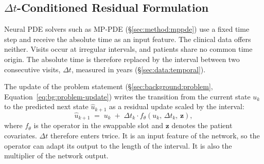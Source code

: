 \subsection{\texorpdfstring{$\Delta t$}{Delta t}-Conditioned Residual Formulation}
\label{sec:method:dt-residual}

Neural PDE solvers such as MP-PDE (\S\ref{sec:method:mppde}) use a fixed
time step and receive the absolute time as an input feature. The clinical data offers neither. Visits
occur at irregular intervals, and patients share no common time origin. The
absolute time is therefore replaced by the interval between two
consecutive visits, $\Delta t$, measured in years (\S\ref{sec:data:temporal}).

The update of the problem statement (\S\ref{sec:background:problem},
Equation~\eqref{eq:bg:problem-update}) writes the transition from the
current state $u_k$ to the predicted next state $\hat u_{k+1}$ as a
residual update scaled by the interval:
\begin{equation}
  \hat u_{k+1} \;=\; u_k \;+\; \Delta t_k \cdot
  f_\theta\!\left(u_k,\, \Delta t_k,\, \mathbf{z}\right),
  \label{eq:method:residual-update}
\end{equation}
where $f_\theta$ is the operator in the swappable slot and $\mathbf{z}$
denotes the patient covariates. $\Delta t$ therefore enters twice. It is an
input feature of the network, so the operator can adapt its output to the
length of the interval. It is also the multiplier of the network output.

